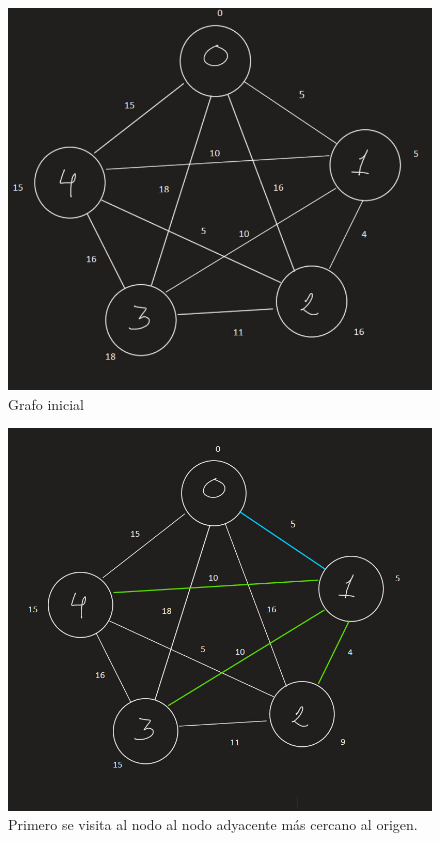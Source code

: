 \documentclass[11pt]{article}
\begin{document}
\begin{figure}[!htbp]
\centering
\includegraphics[scale = .5]{grafos1}
\caption{Grafo inicial}
\end{figure}

\begin{figure}[!htbp]
\centering
\includegraphics[scale = .5]{grafos2}
\caption{Primero se visita al nodo al nodo adyacente más cercano al origen.}
\end{figure}
\end{document}
